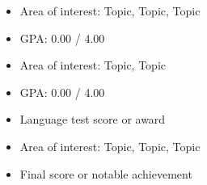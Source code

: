 \begin{itemize}
  \item Area of interest: Topic, Topic, Topic
  \item GPA: 0.00 / 4.00
\end{itemize}

\begin{itemize}
  \item Area of interest: Topic, Topic
  \item GPA: 0.00 / 4.00
  \item Language test score or award
\end{itemize}

\begin{itemize}
  \item Area of interest: Topic, Topic, Topic
  \item Final score or notable achievement
\end{itemize}
